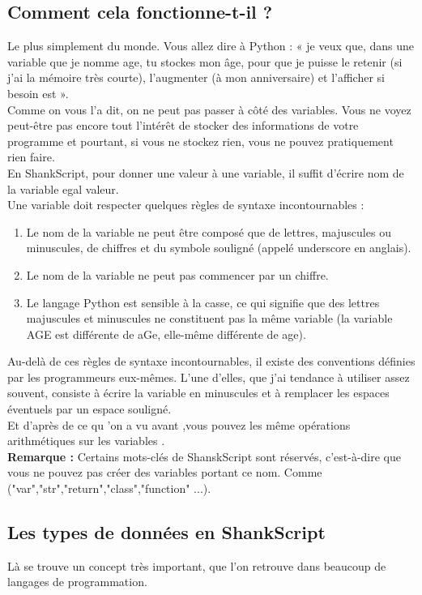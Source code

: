 \subsection{Comment cela fonctionne-t-il ?}
Le plus simplement du monde. Vous allez dire à Python : « je veux que, dans une variable que je nomme age, tu stockes mon âge, pour que je puisse le retenir (si j'ai la mémoire très courte), l'augmenter (à mon anniversaire) et l'afficher si besoin est ».
\\[0.5cm]
Comme on vous l'a dit, on ne peut pas passer à côté des variables. Vous ne voyez peut-être pas encore tout l'intérêt de stocker des informations de votre programme et pourtant, si vous ne stockez rien, vous ne pouvez pratiquement rien faire.
\\[0.5cm]
En ShankScript, pour donner une valeur à une variable, il suffit d'écrire nom de la  variable egal valeur.
\\[0.5cm]
Une variable doit respecter quelques règles de syntaxe incontournables :
\\[0.5cm]
\begin{enumerate}
\item Le nom de la variable ne peut être composé que de lettres, majuscules ou minuscules, de chiffres et du symbole souligné  (appelé underscore en anglais).
\item Le nom de la variable ne peut pas commencer par un chiffre.
\item Le langage Python est sensible à la casse, ce qui signifie que des lettres majuscules et minuscules ne constituent pas la même variable (la variable AGE est différente de aGe, elle-même différente de age).
\end{enumerate}

Au-delà de ces règles de syntaxe incontournables, il existe des conventions définies par les programmeurs eux-mêmes. L'une d'elles, que j'ai tendance à utiliser assez souvent, consiste à écrire la variable en minuscules et à remplacer les espaces éventuels par un espace souligné.
\\[0.5cm]
Et d'après de ce qu 'on a vu avant ,vous pouvez les même opérations arithmétiques sur les variables .
\\[1cm]
\textbf{Remarque :} Certains mots-clés de ShanskScript sont réservés, c'est-à-dire que vous ne pouvez pas créer des variables portant ce nom. Comme ("var","str","return","class","function" ...).


\subsection{Les types de données en ShankScript}
Là se trouve un concept très important, que l'on retrouve dans beaucoup de langages de programmation.
\\
